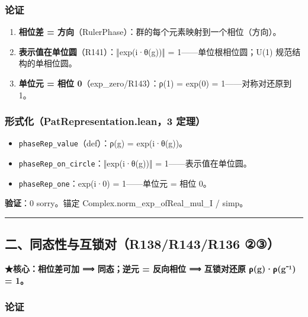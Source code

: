 \documentclass[
]{article}
\providecommand{\tightlist}{%
  \setlength{\itemsep}{0pt}\setlength{\parskip}{0pt}}
\begin{document}
\subsubsection{论证}\label{ux8bbaux8bc1}

\begin{enumerate}
\def\labelenumi{\arabic{enumi}.}
\tightlist
\item
  \textbf{相位差 =
  方向}（RulerPhase）：群的每个元素映射到一个相位（方向）。
\item
  \textbf{表示值在单位圆}（R141）：‖exp(i·θ(g))‖ =
  1------单位根相位圆；U(1) 规范结构的单相位圆。
\item
  \textbf{单位元 = 相位 0}（exp\_zero/R143）：ρ(1) = exp(0) =
  1------对称对还原到 1。
\end{enumerate}

\subsubsection{形式化（PatRepresentation.lean，3
定理）}\label{ux5f62ux5f0fux5316patrepresentation.lean3-ux5b9aux7406}

\begin{itemize}
\tightlist
\item
  \texttt{phaseRep\_value}（def）：ρ(g) = exp(i·θ(g))。
\item
  \texttt{phaseRep\_on\_circle}：‖exp(i·θ(g))‖ = 1------表示值在单位圆。
\item
  \texttt{phaseRep\_one}：exp(i·0) = 1------单位元 = 相位 0。
\end{itemize}

\textbf{验证}：0 sorry。锚定 Complex.norm\_exp\_ofReal\_mul\_I / simp。

\begin{center}\rule{0.5\linewidth}{0.5pt}\end{center}

\subsection{二、同态性与互锁对（R138/R143/R136
②③）}\label{ux4e8cux540cux6001ux6027ux4e0eux4e92ux9501ux5bf9r138r143r136-ux2461ux2462}

\textbf{★核心：相位差可加 ⟹ 同态；逆元 = 反向相位 ⟹ 互锁对还原
ρ(g)·ρ(g⁻¹) = 1。}

\subsubsection{论证}\label{ux8bbaux8bc1-1}
\end{document}
